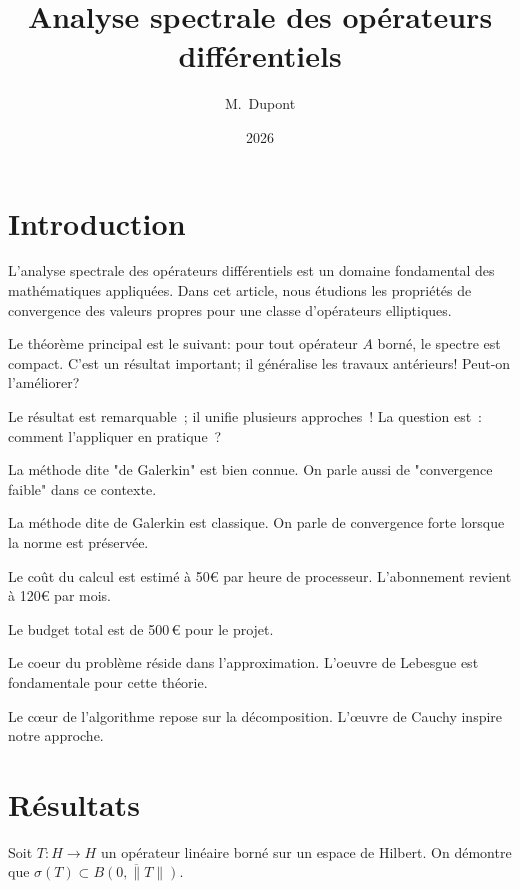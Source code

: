 \documentclass{article}
\title{Analyse spectrale des op\'erateurs diff\'erentiels}
\author{M.~Dupont}
\date{2026}
\begin{document}
\maketitle

\section{Introduction}

L'analyse spectrale des op\'erateurs diff\'erentiels est un domaine fondamental
des math\'ematiques appliqu\'ees.  Dans cet article, nous \'etudions les propri\'et\'es
de convergence des valeurs propres pour une classe d'op\'erateurs elliptiques.

Le th\'eor\`eme principal est le suivant: pour tout op\'erateur $A$ born\'e, le
spectre est compact. C'est un r\'esultat important; il g\'en\'eralise les travaux
ant\'erieurs! Peut-on l'am\'eliorer?

Le r\'esultat est remarquable~; il unifie plusieurs approches~! La question est~:
comment l'appliquer en pratique~?

La m\'ethode dite "de Galerkin" est bien connue.  On parle aussi de "convergence
faible" dans ce contexte.

La m\'ethode dite \og de Galerkin\fg{} est classique.  On parle de \og convergence
forte\fg{} lorsque la norme est pr\'eserv\'ee.

Le co\^ut du calcul est estim\'e \`a 50\euro{} par heure de processeur.
L'abonnement revient \`a 120\euro{} par mois.

Le budget total est de 500\,\euro{} pour le projet.

Le coeur du probl\`eme r\'eside dans l'approximation.  L'oeuvre de Lebesgue
est fondamentale pour cette th\'eorie.

Le c\oe{}ur de l'algorithme repose sur la d\'ecomposition.  L'\oe{}uvre de
Cauchy inspire notre approche.

\section{R\'esultats}

Soit $T \colon H \to H$ un op\'erateur lin\'eaire born\'e sur un espace de Hilbert.
On d\'emontre que $\sigma(T) \subset \overline{B(0,\|T\|)}$.
\end{document}
